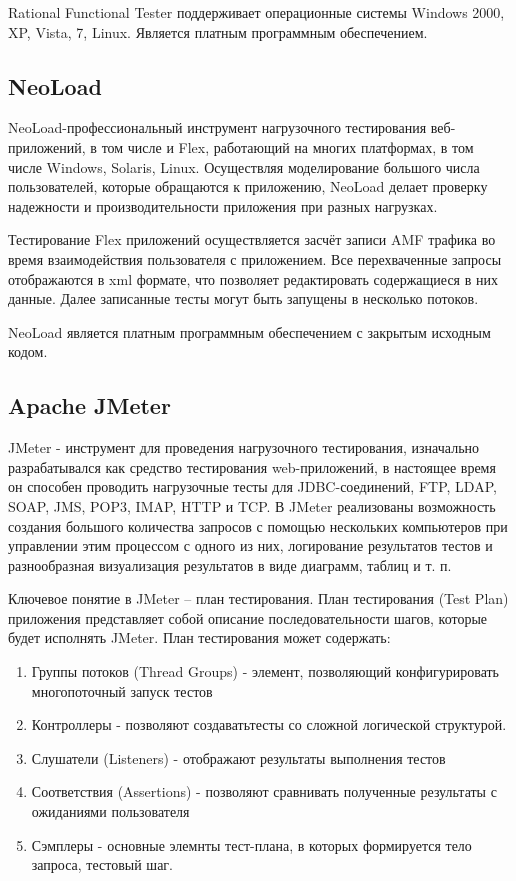 Rational Functional Tester поддерживает операционные системы Windows 
2000, XP, Vista, 7, Linux. Является платным программным обеспечением.

\subsection*{NeoLoad}

NeoLoad-профессиональный инструмент нагрузочного тестирования веб-приложений, 
 в том числе и Flex, работающий на многих платформах, в том числе Windows, Solaris, Linux. 
Осуществляя моделирование большого числа пользователей, которые обращаются 
к приложению, NeoLoad делает проверку надежности и производительности 
приложения при разных нагрузках.

Тестирование Flex приложений осуществляется засчёт записи AMF трафика во 
время взаимодействия пользователя с приложением. Все перехваченные запросы 
отображаются в xml формате, что позволяет редактировать содержащиеся в них 
данные. Далее записанные тесты могут быть запущены в несколько потоков.

NeoLoad является платным программным обеспечением с закрытым исходным кодом. 
 
\subsection*{Apache JMeter}

JMeter - инструмент для проведения нагрузочного тестирования, изначально 
разрабатывался как средство тестирования web-приложений, в настоящее время 
он способен проводить нагрузочные тесты для JDBC-соединений, FTP, LDAP, SOAP, 
JMS, POP3, IMAP, HTTP и TCP. 
В JMeter реализованы возможность создания большого количества запросов с 
помощью нескольких компьютеров при управлении этим процессом с одного из них,
  логирование результатов тестов и разнообразная визуализация результатов в 
  виде диаграмм, таблиц и т. п.

Ключевое понятие в JMeter – план тестирования. План тестирования (Test Plan) 
приложения представляет собой описание последовательности шагов, которые 
будет исполнять JMeter. План тестирования может содержать:

\begin{enumerate}
\item Группы потоков (Thread Groups) - элемент, позволяющий конфигурировать 
многопоточный запуск тестов
\item Контроллеры - позволяют создаватьтесты со сложной логической структурой.
\item Слушатели (Listeners) - отображают результаты выполнения тестов
\item Соответствия (Assertions) - позволяют сравнивать полученные результаты с
ожиданиями пользователя
\item Сэмплеры - основные элемнты тест-плана, в которых формируется тело 
запроса, тестовый шаг.
\end{enumerate}

